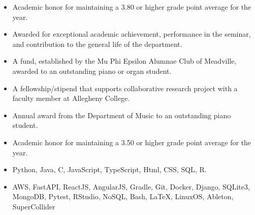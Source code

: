 \documentclass[10pt,a4paper,ragged2e]{altacv}
\begin{document}
\begin{itemize}
\item Academic honor for maintaining a 3.80 or higher grade point average for the year.
\end{itemize}
\smallskip
{}
\begin{itemize}
\item Awarded for exceptional academic achievement, performance in the seminar, and contribution to the general life of the department.
\end{itemize}
\smallskip
{}
\begin{itemize}
\item A fund, established by the Mu Phi Epsilon Alumnae Club of Meadville, awarded to an outstanding piano or organ student.
\end{itemize}
\smallskip
{}
\begin{itemize}
\item A fellowship/stipend that supports collaborative research project with a faculty member at Allegheny College.
\end{itemize}
\smallskip
{}
\begin{itemize}
\item Annual award from the Department of Music to an outstanding piano student.
\end{itemize}
\smallskip
{}
\begin{itemize}
\item Academic honor for maintaining a 3.50 or higher grade point average for the year.
\end{itemize}

\begin{itemize}
\item Python, Java, C, JavaScript, TypeScript, Html, CSS, SQL, R.
\item AWS, FastAPI, ReactJS, AngularJS, Gradle, Git, Docker, Django, SQLite3, MongoDB, Pytest, RStudio, NoSQL, Bash, \LaTeX, LinuxOS, Ableton, SuperCollider
\end{itemize}





\end{document}
